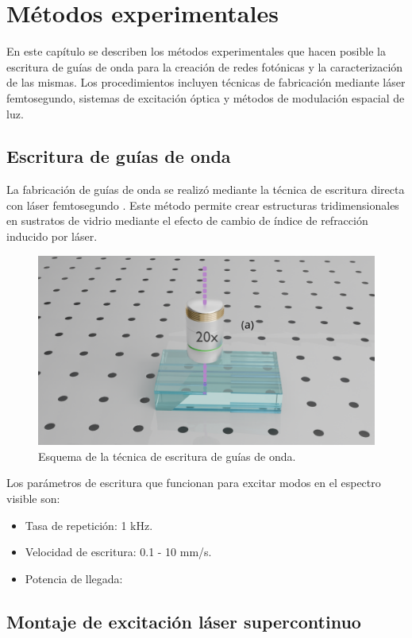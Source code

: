 \chapter{Métodos experimentales}

En este capítulo se describen los métodos experimentales que hacen posible la escritura de guías de onda para la creación de redes fotónicas y la caracterización de las mismas. Los procedimientos incluyen técnicas de fabricación mediante láser femtosegundo, sistemas de excitación óptica y métodos de modulación espacial de luz.

\section{Escritura de guías de onda \label{cap:fs}}

La fabricación de guías de onda se realizó mediante la técnica de escritura directa con láser femtosegundo \citep{femto_writing}. Este método permite crear estructuras tridimensionales en sustratos de vidrio mediante el efecto de cambio de índice de refracción inducido por láser.

\begin{figure}[H]
    \centering
    \includegraphics[width=0.6\linewidth, trim={18cm 4cm 15cm 6cm},clip]{media/fabrication}
    \caption{Esquema de la técnica de escritura de guías de onda.}
\end{figure}

Los parámetros de escritura que funcionan para excitar modos en el espectro visible son:
\begin{itemize}
    \item Tasa de repetición: 1 kHz.
    \item Velocidad de escritura: 0.1 - 10 mm/s.
    \item Potencia de llegada: 
\end{itemize}

\section{Montaje de excitación láser supercontinuo}

